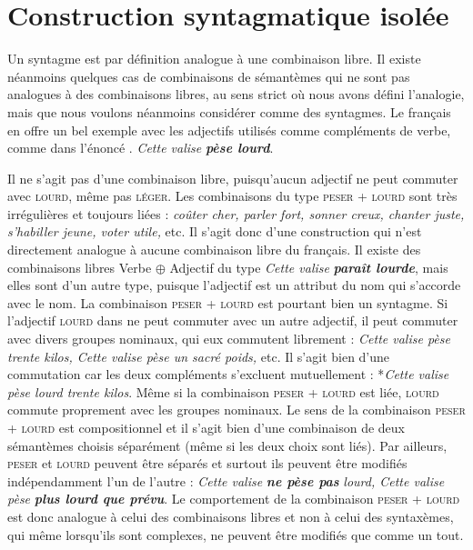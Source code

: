 \section{Construction syntagmatique isolée}\label{sec:3.1.14}

Un syntagme est par définition analogue à une combinaison libre. Il existe néanmoins quelques cas de combinaisons de sémantèmes qui ne sont pas analogues à des combinaisons libres, au sens strict où nous avons défini l’analogie, mais que nous voulons néanmoins considérer comme des syntagmes. Le français en offre un bel exemple avec les adjectifs utilisés comme compléments de verbe, comme dans l’énoncé .
\ea\label{ex:3.1-lourd}\textit{Cette valise} \textbf{\textit{pèse lourd}}.\z

Il ne s’agit pas d’une combinaison libre, puisqu’aucun adjectif ne peut commuter avec \textsc{lourd}, même pas \textsc{léger}. Les combinaisons du type \textsc{peser} + \textsc{lourd} sont très irrégulières et toujours liées : \textit{coûter cher, parler fort, sonner creux, chanter juste, s’habiller jeune, voter utile,} etc. Il s’agit donc d’une construction qui n’est directement analogue à aucune combinaison libre du français. Il existe des combinaisons libres Verbe ${\oplus}$ Adjectif du type \textit{Cette valise} \textbf{\textit{paraît lourde}}, mais elles sont d’un autre type, puisque l’adjectif est un attribut du nom qui s’accorde avec le nom. La combinaison \textsc{peser} + \textsc{lourd} est pourtant bien un syntagme. Si l’adjectif \textsc{lourd} dans  ne peut commuter avec un autre adjectif, il peut commuter avec divers groupes nominaux, qui eux commutent librement : \textit{Cette valise pèse trente kilos, Cette valise pèse un sacré poids,} etc. Il s’agit bien d’une commutation car les deux compléments s’excluent mutuellement : *\textit{Cette valise pèse lourd trente kilos}. Même si la combinaison \textsc{peser} + \textsc{lourd} est liée, \textsc{lourd} commute proprement avec les groupes nominaux. Le sens de la combinaison \textsc{peser} + \textsc{lourd} est compositionnel et il s’agit bien d’une combinaison de deux sémantèmes choisis séparément (même si les deux choix sont liés). Par ailleurs, \textsc{peser} et \textsc{lourd} peuvent être séparés et surtout ils peuvent être modifiés indépendamment l’un de l’autre : \textit{Cette valise} \textbf{\textit{ne pèse pas}} \textit{lourd, Cette valise pèse} \textbf{\textit{plus lourd que prévu}}. Le comportement de la combinaison \textsc{peser} + \textsc{lourd} est donc analogue à celui des combinaisons libres et non à celui des syntaxèmes, qui même lorsqu’ils sont complexes, ne peuvent être modifiés que comme un tout.

